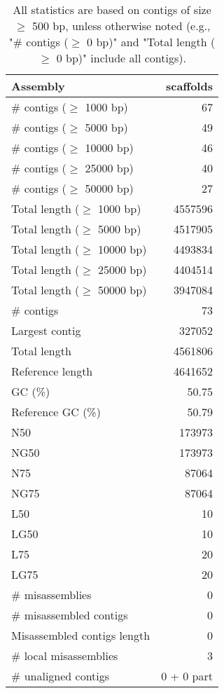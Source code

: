 \documentclass[12pt,a4paper]{article}
\begin{document}
\begin{table}[ht]
\begin{center}
\caption{All statistics are based on contigs of size $\geq$ 500 bp, unless otherwise noted (e.g., "\# contigs ($\geq$ 0 bp)" and "Total length ($\geq$ 0 bp)" include all contigs).}
\begin{tabular}{|l*{1}{|r}|}
\hline
Assembly & scaffolds \\ \hline
\# contigs ($\geq$ 1000 bp) & 67 \\ \hline
\# contigs ($\geq$ 5000 bp) & 49 \\ \hline
\# contigs ($\geq$ 10000 bp) & 46 \\ \hline
\# contigs ($\geq$ 25000 bp) & 40 \\ \hline
\# contigs ($\geq$ 50000 bp) & 27 \\ \hline
Total length ($\geq$ 1000 bp) & 4557596 \\ \hline
Total length ($\geq$ 5000 bp) & 4517905 \\ \hline
Total length ($\geq$ 10000 bp) & 4493834 \\ \hline
Total length ($\geq$ 25000 bp) & 4404514 \\ \hline
Total length ($\geq$ 50000 bp) & 3947084 \\ \hline
\# contigs & 73 \\ \hline
Largest contig & 327052 \\ \hline
Total length & 4561806 \\ \hline
Reference length & 4641652 \\ \hline
GC (\%) & 50.75 \\ \hline
Reference GC (\%) & 50.79 \\ \hline
N50 & 173973 \\ \hline
NG50 & 173973 \\ \hline
N75 & 87064 \\ \hline
NG75 & 87064 \\ \hline
L50 & 10 \\ \hline
LG50 & 10 \\ \hline
L75 & 20 \\ \hline
LG75 & 20 \\ \hline
\# misassemblies & 0 \\ \hline
\# misassembled contigs & 0 \\ \hline
Misassembled contigs length & 0 \\ \hline
\# local misassemblies & 3 \\ \hline
\# unaligned contigs & 0 + 0 part \\ \hline

\end{tabular}
\end{center}
\end{table}
\end{document}
